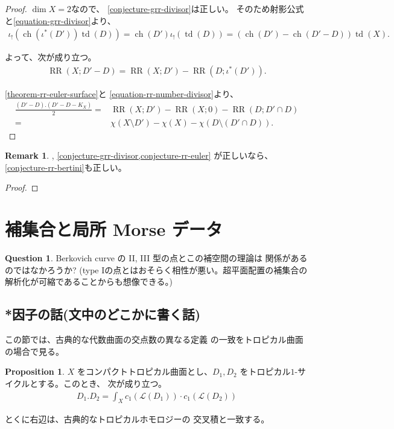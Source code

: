 \documentclass[a4paper,dvipdfmx,reqno,12pt]{amsart}
\theoremstyle{definition}
\newtheorem{proposition}[theorem]{Proposition}
\newtheorem{question}[theorem]{Question}
\newtheorem{remark}[theorem]{Remark}
\newcommand{\opn}[1]{\operatorname{#1}}
\numberwithin{equation}{section}
\begin{document}
\begin{proof}
$\dim X=2$なので、
\cref{conjecture-grr-divisor}は正しい。
そのため射影公式と\eqref{equation-grr-divisor}より、
\begin{align}
\iota_!(\opn{ch}(\iota^{*}(D'))\opn{td}(D))
=\opn{ch}(D')\iota_!(\opn{td}(D))
=(\opn{ch}(D')-\opn{ch}(D'-D))\opn{td}(X).
\end{align}

よって、次が成り立つ。
\begin{align}
\label{equation-rr-number-divisor}
\opn{RR}(X;D'-D)=\opn{RR}(X;D')-
\opn{RR}(D;\iota^{*}(D')).
\end{align}

\cref{theorem-rr-euler-surface}と
\eqref{equation-rr-number-divisor}より、
\begin{align}
\frac{(D'-D).(D'-D-K_X)}{2}=&
\opn{RR}(X;D')-\opn{RR}(X;0)-
\opn{RR}(D;D'\cap D) \\
=&\chi(X\setminus D')-\chi(X)-\chi(D\setminus (D'\cap D)).
\end{align}
\end{proof}

\begin{remark}
\cite[Conjecture 6.13]{demedrano2023chern},
\cref{conjecture-grr-divisor,conjecture-rr-euler}
が正しいなら、\cref{conjecture-rr-bertini}も正しい。  
\end{remark}

\begin{proof}





\end{proof}



\section{補集合と局所 Morse データ}

\begin{question}
Berkovich curve の II, III 型の点とこの補空間の理論は
関係があるのではなかろうか? 
(type Iの点とはおそらく相性が悪い。超平面配置の補集合の
解析化が可縮であることからも想像できる。)
\end{question}





\subsection{*因子の話(文中のどこかに書く話)}
この節では、古典的な代数曲面の交点数の異なる定義
の一致をトロピカル曲面の場合で見る。
\begin{proposition}
\label{proposition-cycle-chern}
$X$ をコンパクトトロピカル曲面とし、$D_1,D_2$
をトロピカル$1$-サイクルとする。このとき、
次が成り立つ。
\begin{align}
D_1 . D_2=\int_X c_1(\mathcal{L}(D_1))
\cdot c_1(\mathcal{L}(D_2))
\end{align}

とくに右辺は、古典的なトロピカルホモロジーの
交叉積と一致する。

\end{proposition}
\end{document}
